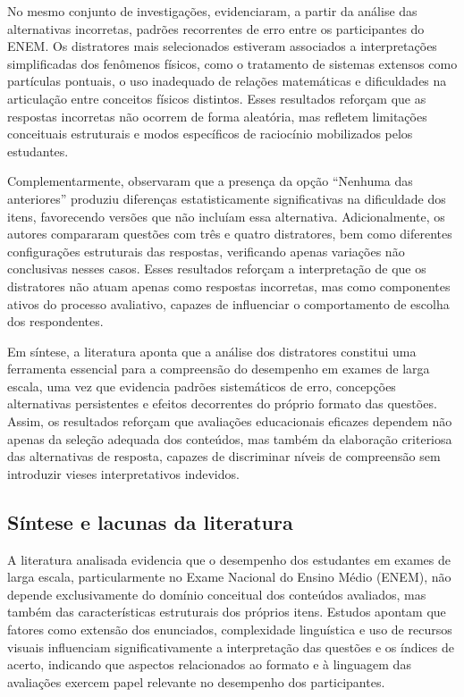 \documentclass[a4paper,10pt, twocolumn]{article}
\begin{document}
No mesmo conjunto de investigações, \textcite{lopes2015estudo} evidenciaram, a partir da análise das alternativas incorretas, padrões recorrentes de erro entre os participantes do ENEM. Os distratores mais selecionados estiveram associados a interpretações simplificadas dos fenômenos físicos, como o tratamento de sistemas extensos como partículas pontuais, o uso inadequado de relações matemáticas e dificuldades na articulação entre conceitos físicos distintos. Esses resultados reforçam que as respostas incorretas não ocorrem de forma aleatória, mas refletem limitações conceituais estruturais e modos específicos de raciocínio mobilizados pelos estudantes.

Complementarmente,\textcite{Caldwell2013}  observaram que a presença da opção “Nenhuma das anteriores” produziu diferenças estatisticamente significativas na dificuldade dos itens, favorecendo versões que não incluíam essa alternativa. Adicionalmente, os autores compararam questões com três e quatro distratores, bem como diferentes configurações estruturais das respostas, verificando apenas variações não conclusivas nesses casos. Esses resultados reforçam a interpretação de que os distratores não atuam apenas como respostas incorretas, mas como componentes ativos do processo avaliativo, capazes de influenciar o comportamento de escolha dos respondentes.

Em síntese, a literatura aponta que a análise dos distratores constitui uma ferramenta essencial para a compreensão do desempenho em exames de larga escala, uma vez que evidencia padrões sistemáticos de erro, concepções alternativas persistentes e efeitos decorrentes do próprio formato das questões. Assim, os resultados reforçam que avaliações educacionais eficazes dependem não apenas da seleção adequada dos conteúdos, mas também da elaboração criteriosa das alternativas de resposta, capazes de discriminar níveis de compreensão sem introduzir vieses interpretativos indevidos.


\subsection{Síntese e lacunas da literatura}

A literatura analisada evidencia que o desempenho dos estudantes em exames de larga escala, particularmente no Exame Nacional do Ensino Médio (ENEM), não depende exclusivamente do domínio conceitual dos conteúdos avaliados, mas também das características estruturais dos próprios itens. Estudos apontam que fatores como extensão dos enunciados, complexidade linguística e uso de recursos visuais influenciam significativamente a interpretação das questões e os índices de acerto, indicando que aspectos relacionados ao formato e à linguagem das avaliações exercem papel relevante no desempenho dos participantes.
\end{document}
